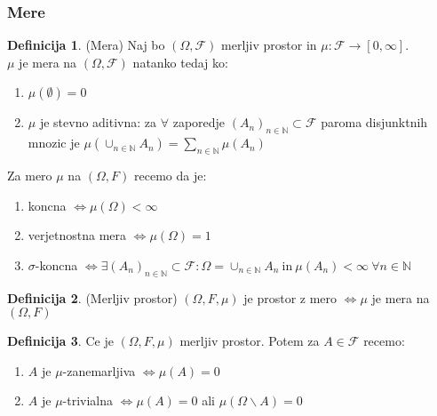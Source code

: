 \documentclass[a4paper,12pt]{article}
\theoremstyle{definition} %
\newtheorem{definicija}{Definicija}[section]
\theoremstyle{plain} %
\newcommand{\N}{\mathbb{N}}
\newcommand{\F}{\mathcal{F}}
\begin{document}
        \subsubsection{Mere}
            \begin{definicija}(Mera)
                Naj bo $\left( \Omega, \F \right)$ merljiv prostor in $\mu: \F \rightarrow [0, \infty] $. \\
                $\mu$ je mera na $\left( \Omega, \F \right)$ natanko tedaj ko: 
                \begin{enumerate}
                    \item $\mu(\emptyset) = 0$
                    \item $\mu$ je stevno aditivna: za $\forall$ zaporedje $(A_n)_{n \in \N} \subset \F$ paroma disjunktnih mnozic je $\mu(\cup_{n \in \N} A_n) = \sum_{n \in \N} \mu(A_n)$
                \end{enumerate}
            \end{definicija}

            Za mero $\mu$ na $\left( \Omega, F \right)$ recemo da je: 
            \begin{enumerate}
                \item koncna $\iff \mu(\Omega) < \infty$
                \item verjetnostna mera $\iff \mu(\Omega) = 1$
                \item $\sigma$-koncna $\iff \exists (A_n)_{n \in \N} \subset \F: \Omega = \cup_{n \in \N} A_n \ \text{in} \ \mu(A_n) < \infty \ \forall n \in \N$
            \end{enumerate}

            \begin{definicija}(Merljiv prostor)
                $\left( \Omega, F, \mu \right)$ je prostor z mero $\iff \mu$ je mera na $(\Omega, F)$
            \end{definicija}

            \begin{definicija}
                Ce je $\left( \Omega, F, \mu \right)$ merljiv prostor. Potem za $A \in \F$ recemo:
                \begin{enumerate}
                    \item $A$ je $\mu$-zanemarljiva $\iff \mu(A) = 0$
                    \item $A$ je $\mu$-trivialna $\iff \mu(A) = 0$ ali $\mu(\Omega\backslash A) = 0$
                \end{enumerate}
            \end{definicija}
\end{document}

